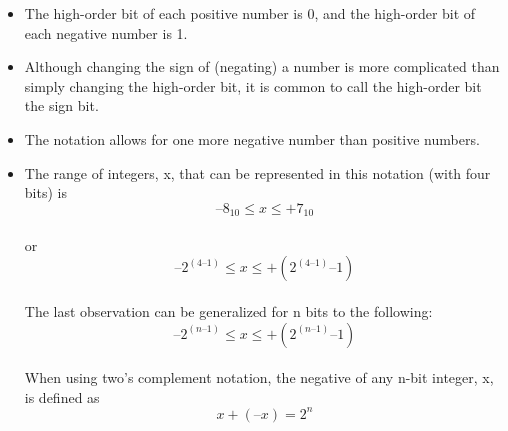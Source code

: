 \documentclass[12pt]{extarticle}
\begin{document}
\vspace{18pt}
\begin{itemize}
  \item The high-order bit of each positive number is 0, and the high-order bit
   of each negative number is 1.
  \item Although changing the sign of (negating) a number is more complicated than simply 
   changing the high-order bit, it is common to call the high-order bit the sign bit.
  \item The notation allows for one more negative number than positive numbers.
  \item The range of integers, x, that can be represented in this notation (with four bits)
    is\\ $$ –8_10 \leq x \leq +7_10 $$   \\ 
    or    $$–2^{(4–1)} \leq x \leq + (2^{(4–1)}  – 1)$$ \\ 
    The last observation can be generalized for n bits to the following: 
    $$ –2^{(n–1)} \leq x \leq +(2^{(n–1)} – 1) $$ \\
   When using two’s complement notation, the negative of any n-bit integer, x, 
   is defined as  \\ $$x + (–x) = 2^n$$
\end{itemize}
\end{document}
